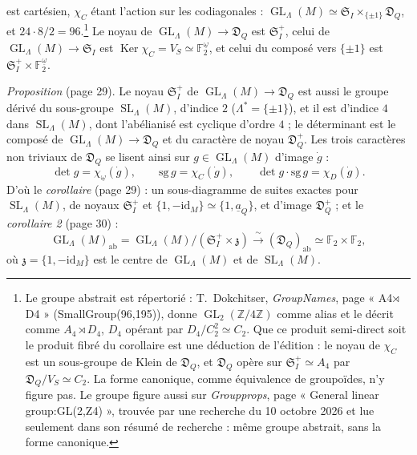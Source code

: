 \documentclass[11pt,a4paper]{article}
\begin{document}
est cartésien, $\chi_C$ étant l'action sur les codiagonales :
$\operatorname{GL}_\Lambda(M) \simeq \mathfrak{S}_I \times_{\{\pm 1\}}
\mathfrak{D}_Q$, et $24 \cdot 8 / 2 = 96$.\footnote{Le groupe abstrait est
répertorié : T.~Dokchitser, \emph{GroupNames}, page « A4$\rtimes$D4 »
(SmallGroup(96,195)), donne $\operatorname{GL}_2(\mathbb{Z}/4\mathbb{Z})$
comme alias et le décrit comme $A_4 \rtimes D_4$, $D_4$ opérant par $D_4 /
C_2^2 \simeq C_2$. Que ce produit semi-direct soit le produit fibré du
corollaire est une déduction de l'édition : le noyau de $\chi_C$ est un
sous-groupe de Klein de $\mathfrak{D}_Q$, et $\mathfrak{D}_Q$ opère sur
$\mathfrak{S}_I^{+} \simeq A_4$ par $\mathfrak{D}_Q / V_S \simeq C_2$. La forme
canonique, comme équivalence de groupoïdes, n'y figure pas. Le groupe figure aussi sur \emph{Groupprops}, page « General linear
group:GL(2,Z4) », trouvée par une recherche du 10 octobre 2026 et lue
seulement dans son résumé de recherche : même groupe abstrait, sans la forme
canonique.} Le noyau de
$\operatorname{GL}_\Lambda(M) \to \mathfrak{D}_Q$ est $\mathfrak{S}_I^{+}$, celui
de $\operatorname{GL}_\Lambda(M) \to \mathfrak{S}_I$ est
$\operatorname{Ker} \chi_C = V_S \simeq \mathbb{F}_2^{\underline{\omega}}$, et
celui du composé vers $\{\pm 1\}$ est $\mathfrak{S}_I^{+} \times
\mathbb{F}_2^{\underline{\omega}}$.

\emph{Proposition} (page 29). Le noyau $\mathfrak{S}_I^{+}$ de
$\operatorname{GL}_\Lambda(M) \to \mathfrak{D}_Q$ est aussi le groupe dérivé du
sous-groupe $\operatorname{SL}_\Lambda(M)$, d'indice $2$
($\Lambda^{*} = \{\pm 1\}$), et il est d'indice $4$ dans
$\operatorname{SL}_\Lambda(M)$, dont l'abélianisé est cyclique d'ordre $4$ ; le
déterminant est le composé de $\operatorname{GL}_\Lambda(M) \to \mathfrak{D}_Q$
et du caractère de noyau $\mathfrak{D}_Q^{+}$. Les trois caractères non
triviaux de $\mathfrak{D}_Q$ se lisent ainsi sur $g \in
\operatorname{GL}_\Lambda(M)$ d'image $\dot g$ :
\[
\det g = \chi_{\underline{\omega}}(\dot g), \qquad \mathrm{sg}\, g =
\chi_C(\dot g), \qquad \det g \cdot \mathrm{sg}\, g = \chi_D(\dot g).
\]
D'où le \emph{corollaire} (page 29) : un sous-diagramme de suites exactes pour
$\operatorname{SL}_\Lambda(M)$, de noyaux $\mathfrak{S}_I^{+}$ et
$\{1, -\mathrm{id}_M\} \simeq \{1, \underline{a}_Q\}$, et d'image
$\mathfrak{D}_Q^{+}$ ; et le \emph{corollaire 2} (page 30) :
\[
\operatorname{GL}_\Lambda(M)_{\mathrm{ab}} = \operatorname{GL}_\Lambda(M) /
(\mathfrak{S}_I^{+} \times \mathfrak{z}) \xrightarrow{\;\sim\;}
(\mathfrak{D}_Q)_{\mathrm{ab}} \simeq \mathbb{F}_2 \times \mathbb{F}_2,
\]
où $\mathfrak{z} = \{1, -\mathrm{id}_M\}$ est le centre de
$\operatorname{GL}_\Lambda(M)$ et de $\operatorname{SL}_\Lambda(M)$.
\end{document}
